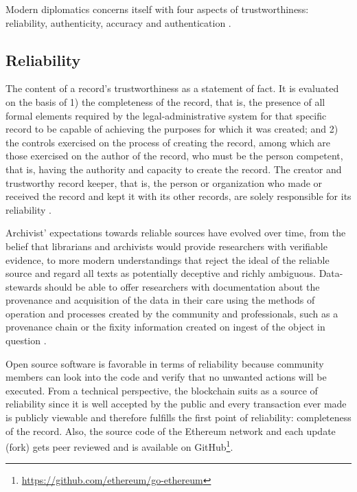 Modern diplomatics concerns itself with four aspects of trustworthiness: reliability, authenticity, accuracy and authentication \cite[10]{kirschenbaum2010digital}.

\subsection{Reliability}
The content of a record's trustworthiness as a statement of fact. It is evaluated on the basis of 1) the completeness of the record, that is, the presence of all formal elements required by the legal-administrative system for that specific record to be capable of achieving the purposes for which it was created; and 2) the controls exercised on the process of creating the record, among which are those exercised on the author of the record, who must be the person competent, that is, having the authority and capacity to create the record.
The creator and trustworthy record keeper, that is, the person or organization who made or received the record and kept it with its other records, are solely responsible for its reliability \cite[52]{duranti2009digital}.

Archivist' expectations towards reliable sources have evolved over time, from the belief that librarians and archivists would provide researchers with verifiable evidence, to more modern understandings that reject the ideal of the reliable source and regard all texts as potentially deceptive and richly ambiguous. Data-stewards should be able to offer researchers with documentation about the provenance and acquisition of the data in their care using the methods of operation and processes created by the community and professionals, such as a provenance chain or the fixity information created on ingest of the object in question \cite[32]{kirschenbaum2010digital}.

Open source software is favorable in terms of reliability because community members can look into the code and verify that no unwanted actions will be executed. From a technical perspective, the blockchain suits as a source of reliability since it is well accepted by the public and every transaction ever made is publicly viewable and therefore fulfills the first point of reliability: completeness of the record. Also, the source code of the Ethereum network and each update (fork) gets peer reviewed and is available on GitHub\footnote{\url{https://github.com/ethereum/go-ethereum}}.


